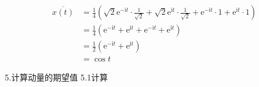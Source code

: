 \begin{equation}
    \begin{aligned}
        \overline{x(t)}&=\frac{1}{4}\left( \sqrt{2}\mathrm{e}^{-\mathrm{i}t}\cdot \frac{1}{\sqrt{2}}+\sqrt{2}\mathrm{e}^{\mathrm{i}t}\cdot \frac{1}{\sqrt{2}}+\mathrm{e}^{-\mathrm{i}t}\cdot 1+\mathrm{e}^{\mathrm{i}t}\cdot 1 \right) 
\\
&=\frac{1}{4}\left( \mathrm{e}^{-\mathrm{i}t}+\mathrm{e}^{\mathrm{i}t}+\mathrm{e}^{-\mathrm{i}t}+\mathrm{e}^{\mathrm{i}t} \right) 
\\
&=\frac{1}{2}\left( \mathrm{e}^{-\mathrm{i}t}+\mathrm{e}^{\mathrm{i}t} \right) 
\\
&=\cos t
    \end{aligned}
\end{equation}


5.计算动量的期望值
5.1计算
